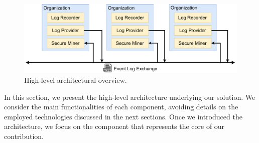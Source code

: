 \begin{figure}[t]
\centering
\includegraphics[width=0.9\linewidth]{content/figures/architecturediagram2.pdf}
\caption{High-level architectural overview.}
\label{fig:architecture_diagram}
\end{figure}
In this section, we present the high-level architecture underlying our solution. We consider the main functionalities of each component, avoiding details on the employed technologies discussed in the next sections. Once we introduced the architecture, we focus on the  component that represents the core of our contribution.

